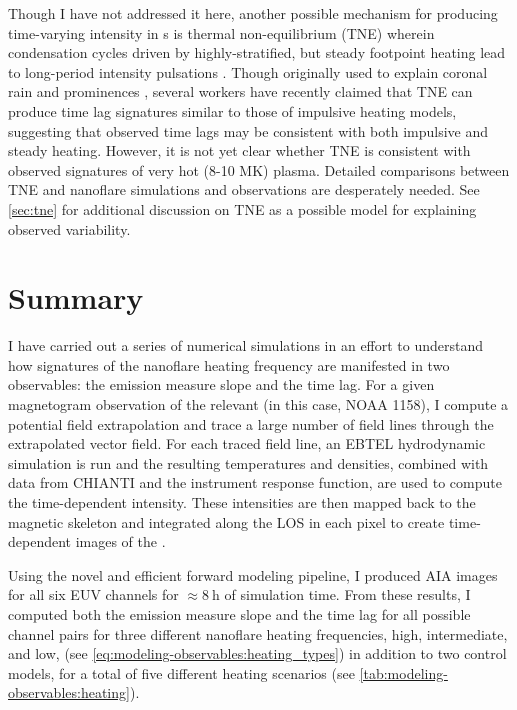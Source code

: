 Though I have not addressed it here, another possible mechanism for producing time-varying intensity in \AR s is thermal non-equilibrium (TNE) wherein condensation cycles driven by highly-stratified, but steady footpoint heating lead to long-period intensity pulsations \citep{kuin_thermal_1982}. Though originally used to explain coronal rain \citep{antolin_coronal_2010,antolin_multithermal_2015,auchere_coronal_2018} and prominences \citep{antiochos_model_1991}, several workers \citep{mok_three-dimensional_2016,winebarger_investigation_2016,froment_long-period_2017,winebarger_identifying_2018,froment_occurrence_2018} have recently claimed that TNE can produce time lag signatures similar to those of impulsive heating models, suggesting that observed time lags may be consistent with both impulsive and steady heating. However, it is not yet clear whether TNE is consistent with observed signatures of very hot (8-10 MK) plasma. Detailed comparisons between TNE and nanoflare simulations and observations are desperately needed. See \autoref{sec:tne} for additional discussion on TNE as a possible model for explaining observed \AR{} variability.

\section{Summary}\label{sec:modeling-observables:conclusions}

I have carried out a series of numerical simulations in an effort to understand how signatures of the nanoflare heating frequency are manifested in two observables: the emission measure slope and the time lag. For a given magnetogram observation of the relevant \AR{} (in this case, NOAA 1158), I compute a potential field extrapolation and trace a large number of field lines through the extrapolated vector field. For each traced field line, an EBTEL hydrodynamic simulation is run and the resulting temperatures and densities, combined with data from CHIANTI and the instrument response function, are used to compute the time-dependent intensity. These intensities are then mapped back to the magnetic skeleton and integrated along the LOS in each pixel to create time-dependent images of the \AR{}.

Using the novel and efficient forward modeling pipeline, I produced AIA images for all six EUV channels for $\approx\SI{8}{\hour}$ of simulation time. From these results, I computed both the emission measure slope and the time lag for all possible channel pairs for three different nanoflare heating frequencies, high, intermediate, and low, (see \autoref{eq:modeling-observables:heating_types}) in addition to two control models, for a total of five different heating scenarios (see \autoref{tab:modeling-observables:heating}).

